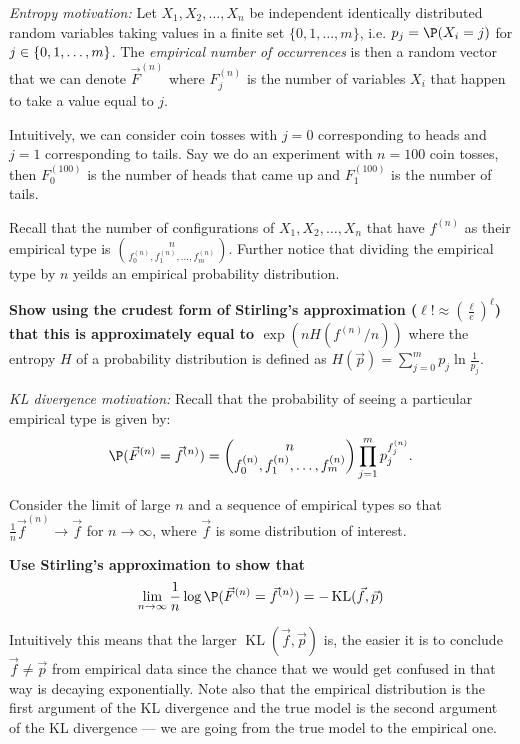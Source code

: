 \documentclass[preview]{standalone}
\begin{document}
\begin{Parts}
\Part \textit{Entropy motivation:}
Let $X_1, X_2, \ldots, X_n$ be independent identically distributed random
variables taking values in a finite set $\{0, 1, \dots, m\}$, i.e. $p_j = \P(X_i = j)$ for $j\in \mathcal \{0, 1, \dots, m\}$.
The \emph{empirical number of occurrences} is then a random vector
that we can denote $\vec F^{(n)}$ where $F^{(n)}_j$ is the number of
variables $X_i$ that happen to take a value equal to $j$.

Intuitively, we can consider coin tosses with $j = 0$ corresponding to heads and
$j=1$ corresponding to tails. Say we do an experiment with $n=100$ coin tosses, then
$F^{(100)}_0$ is the number of heads that came up and $F^{(100)}_1$ is the number of tails.

Recall that the number of configurations of $X_1, X_2, \ldots, X_n$
that have $f^{(n)}$ as their empirical type is $\binom{n}{f^{(n)}_0,
  f^{(n)}_1, \ldots, f^{(n)}_m}$. Further notice that dividing the
empirical type by $n$ yeilds an empirical probability distribution.

{\bf Show using the crudest form of Stirling's approximation ($\ell !
  \approx (\frac{\ell}{e})^{\ell}$) that this is approximately equal
  to $\exp(n H(f^{(n)}/n))$} where the entropy $H$ of a probability
distribution is defined as $H(\vec p) = \sum_{j=0}^{m} p_j \ln
\frac{1}{p_j}$.

\Part \textit{KL divergence motivation:}
Recall that the probability of seeing a particular empirical type is
given by:
$$
\P(\vec F^{(n)} = \vec f^{(n)}) =
\binom{n}{f^{(n)}_0, f^{(n)}_1, \dots, f^{(n)}_m} \prod_{j=1}^m p_j^{f^{(n)}_j}.
$$

Consider the limit of large $n$ and a sequence of empirical types so
that $\frac 1 n \vec f^{(n)} \rightarrow \vec f$ for $n\rightarrow
\infty$, where $\vec f$ is some distribution of interest.

\textbf{Use Stirling's approximation to show that}
$$
\lim_{n\rightarrow \infty} \frac 1 n \log \P(\vec F^{(n)} = \vec f^{(n)}) = -\operatorname{KL}(\vec f, \vec p)
$$

Intuitively this means that the larger $\operatorname{KL}(\vec f, \vec p)$ is, the easier it is to
conclude $\vec f \neq \vec p$ from empirical data since the chance
that we would get confused in that way is decaying exponentially. Note
also that the empirical distribution is the first argument of the KL
divergence and the true model is the second argument of the KL
divergence --- we are going from the true model to the empirical one.




\end{Parts}
\end{document}
